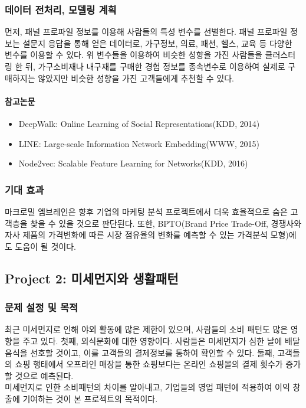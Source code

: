 \documentclass[11pt]{article}
\begin{document}
\subsubsection{데이터 전처리, 모델링 계획}
먼저, 패널 프로파일 정보를 이용해 사람들의 특성 변수를 선별한다. 패널 프로파일 정보는 설문지 응답을 통해 얻은 데이터로, 가구정보, 의료, 패션, 헬스, 교육 등 다양한 변수를 이용할 수 있다. 위 변수들을 이용하여 비슷한 성향을 가진 사람들을 클러스터링 한 뒤, 가구소비재나 내구재를 구매한 경험 정보를 종속변수로 이용하여 실제로 구매하지는 않았지만 비슷한 성향을 가진 고객들에게 추천할 수 있다.
\paragraph{참고논문}
\begin{itemize}
	\item DeepWalk: Online Learning of Social Representations(KDD, 2014)
	\item LINE: Large-scale Information Network Embedding(WWW, 2015)
	\item Node2vec: Scalable Feature Learning for Networks(KDD, 2016)
\end{itemize}


\subsubsection{기대 효과}
마크로밀 엠브레인은 향후 기업의 마케팅 분석 프로젝트에서 더욱 효율적으로 숨은 고객층을 찾을 수 있을 것으로 판단된다. 또한, BPTO(Brand Price Trade-Off, 경쟁사와 자사 제품의 가격변화에 따른 시장 점유율의 변화를 예측할 수 있는 가격분석 모형)에도 도움이 될 것이다.

\subsection{Project 2: 미세먼지와 생활패턴}
\subsubsection{문제 설정 및 목적}
최근 미세먼지로 인해 야외 활동에 많은 제한이 있으며, 사람들의 소비 패턴도 많은 영향을 주고 있다. 첫째, 외식문화에 대한 영향이다. 사람들은 미세먼지가 심한 날에 배달음식을 선호할 것이고, 이를 고객들의 결제정보를 통하여 확인할 수 있다. 둘째, 고객들의 쇼핑 행태에서 오프라인 매장을 통한 쇼핑보다는 온라인 쇼핑몰의 결제 횟수가 증가할 것으로 예측된다. \\
미세먼지로 인한 소비패턴의 차이를 알아내고, 기업들의 영업 패턴에 적용하여 이익 창출에 기여하는 것이 본 프로젝트의 목적이다.
\end{document}
